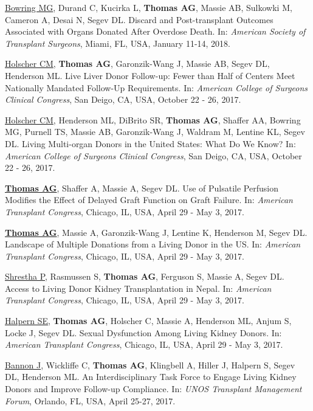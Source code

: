 \documentclass[10pt]{article}
\makeatletter
\newlength{\bibhang}
\newlength{\bibsep}
 {\@listi \global\bibsep\itemsep \global\advance\bibsep by\parsep}
\newenvironment{bibenum*}
  {\renewcommand\labelenumi{[\theenumi]}%
   \etaremune[
     topsep=0pt,
     itemsep=\bibsep,
     parsep=0pt,partopsep=0pt,
     itemindent=-\bibhang,
     leftmargin={\bibhang+\widthof{[999]}}]}
  {\endetaremune}
\makeatother
\begin{document}
\begin{bibenum*}
\item \underline{Bowring MG}, Durand C, Kucirka L, \textbf{Thomas AG},
  Massie AB, Sulkowki M, Cameron A, Desai N, Segev DL.
  Discard and Post-transplant Outcomes Associated with Organs
  Donated After Overdose Death.
  In: \emph{American Society of Transplant Surgeons},
  Miami, FL, USA, January 11-14, 2018.

\item \underline{Holscher CM}, \textbf{Thomas AG}, Garonzik-Wang J,
  Massie AB, Segev DL, Henderson ML. Live Liver Donor Follow-up: Fewer
  than Half of Centers Meet Nationally Mandated Follow-Up Requirements.
  In: \emph{American College of Surgeons Clinical Congress},
  San Deigo, CA, USA, October 22 - 26, 2017.

\item \underline{Holscher CM}, Henderson ML, DiBrito SR, \textbf{Thomas AG},
  Shaffer AA, Bowring MG, Purnell TS, Massie AB, Garonzik-Wang J,
  Waldram M, Lentine KL, Segev DL. Living Multi-organ Donors in the
  United States: What Do We Know?
  In: \emph{American College of Surgeons Clinical Congress},
  San Deigo, CA, USA, October 22 - 26, 2017.

\item \underline{\textbf{Thomas AG}}, Shaffer A, Massie A, Segev DL.
  Use of Pulsatile Perfusion Modifies the Effect of
  Delayed Graft Function on Graft Failure.
  In: \emph{American Transplant Congress},
  Chicago, IL, USA, April 29 - May 3, 2017.

\item \underline{\textbf{Thomas AG}}, Massie A, Garonzik-Wang J,
  Lentine K, Henderson M, Segev DL.
  Landscape of Multiple Donations from a Living Donor in the US.
  In: \emph{American Transplant Congress},
  Chicago, IL, USA, April 29 - May 3, 2017.

\item \underline{Shrestha P}, Rasmussen S, \textbf{Thomas AG},
  Ferguson S, Massie A, Segev DL.
  Access to Living Donor Kidney Transplantation in Nepal.
  In: \emph{American Transplant Congress},
  Chicago, IL, USA, April 29 - May 3, 2017.

\item \underline{Halpern SE}, \textbf{Thomas AG}, Holscher C, Massie A,
  Henderson ML, Anjum S, Locke J, Segev DL.
  Sexual Dysfunction Among Living Kidney Donors.
  In: \emph{American Transplant Congress},
  Chicago, IL, USA, April 29 - May 3, 2017.

\item \underline{Bannon J}, Wickliffe C, \textbf{Thomas AG}, Klingbell A,
  Hiller J, Halpern S, Segev DL, Henderson ML.
  An Interdisciplinary Task Force to Engage Living Kidney
  Donors and Improve Follow-up Compliance.
  In: \emph{UNOS Transplant Management Forum},
  Orlando, FL, USA, April 25-27, 2017.


\end{bibenum*}
\end{document}
